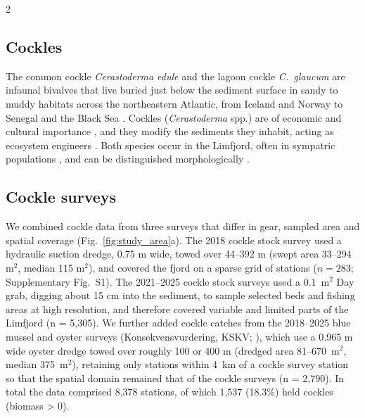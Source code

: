 \begin{spacing}{2}
\subsection{Cockles}
The common cockle \textit{Cerastoderma edule} and the lagoon cockle
\textit{C.~glaucum} are infaunal bivalves that live buried just below the sediment surface in sandy to muddy habitats across the northeastern Atlantic, from Iceland and Norway to Senegal and the Black Sea \citep{Dabouineau2011,
malhamReviewBiologyEuropean2012}. Cockles (\textit{Cerastoderma} spp.) are of
economic and cultural importance \citep[e.g.][]{carssEcosystemServicesProvided2020}, and they modify the sediments they inhabit, acting as ecosystem engineers \citep[e.g.][]{donadiMultiscaleHabitatModification2015}. Both species occur in the
Limfjord, often in sympatric populations \citep{brockGeographicalDistributionCerastoderma1980,
ivellQUANTITATIVESTUDYCERASTODERMA1981, Freitas2024}, and can be distinguished
morphologically \citep{Parada2018}.

\subsection{Cockle surveys}\label{sec:surveys}

We combined cockle data from three surveys that differ in gear, sampled area and spatial coverage (Fig.~\ref{fig:study_area}a). The 2018 cockle stock survey used a hydraulic suction dredge, 0.75 m wide, towed over 44--392 m (swept area 33--294 m$^2$, median 115 m$^2$), and covered the fjord on a sparse grid of stations \citep{freitasSustainableCockleFishery2023} ($n = 283$; Supplementary Fig.~S1). The 2021--2025 cockle stock surveys used a 0.1~m$^2$ Day grab, digging about 15 cm into the sediment, to sample selected beds and fishing areas at high resolution, and therefore covered variable and limited parts of the Limfjord \citep{Freitas2021, Freitas2022, freitasSustainableCockleFishery2023, Freitas2023b,
Freitas2024b, Freitas2025} (n = 5{,}305). We further added cockle catches from the 2018--2025 blue mussel and oyster surveys (Konsekvensvurdering, KSKV;
\citealp{nielsenFlatOysterFishery2019}), which use a 0.965 m wide oyster dredge towed over roughly 100 or 400 m (dredged area 81--670~m$^2$, median 375~m$^2$), retaining only stations within 4~km of a
cockle survey station so that the spatial domain remained that of the cockle surveys (n = 2{,}790). In total the data comprised 8{,}378 stations, of which 1{,}537 (18.3\%) held cockles (biomass > 0).


\end{spacing}
